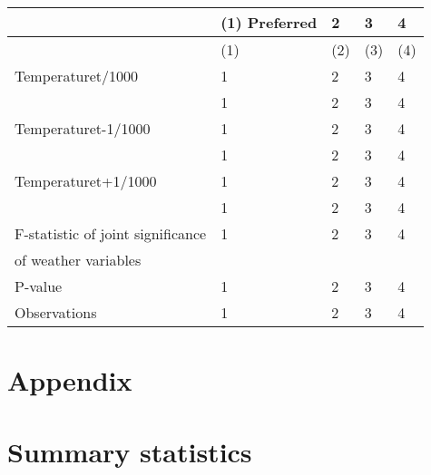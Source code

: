 \documentclass[11pt]{article}
\begin{document}
\begin{tabular}{lllll}
	\toprule[1.5pt]
	{} & (1)
	Preferred &    2 &    3 &    4 \\
	\midrule
	&           (1) &  (2) &  (3) &  (4) \\
	Temperaturet/1000                 &             1 &    2 &    3 &    4 \\
	&             1 &    2 &    3 &    4 \\
	Temperaturet-1/1000               &             1 &    2 &    3 &    4 \\
	&             1 &    2 &    3 &    4 \\
	Temperaturet+1/1000               &             1 &    2 &    3 &    4 \\
	&             1 &    2 &    3 &    4 \\
	\midrule
	F-statistic of joint significance &             1 &    2 &    3 &    4 \\
	of weather variables              &               &      &      &      \\
	P-value                           &             1 &    2 &    3 &    4 \\
	\midrule
	Observations                      &             1 &    2 &    3 &    4 \\
	\bottomrule[2pt]
\end{tabular}


\newpage

\begin{subappendices}
\appendix

\section*{Appendix}\label{Appendix}
\singlespacing
\section{Summary statistics}\label{ASec:xxxxx}
	
\end{subappendices}	



\newpage
{\footnotesize 
	
	\singlespacing
	
}


\end{document}
